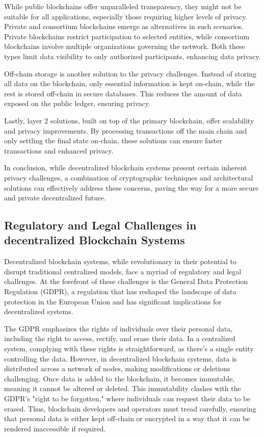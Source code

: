 While public blockchains offer unparalleled transparency, they might not be suitable for all applications, especially those requiring higher levels of privacy. Private and consortium blockchains emerge as alternatives in such scenarios. Private blockchains restrict participation to selected entities, while consortium blockchains involve multiple organizations governing the network. Both these types limit data visibility to only authorized participants, enhancing data privacy.

Off-chain storage is another solution to the privacy challenges. Instead of storing all data on the blockchain, only essential information is kept on-chain, while the rest is stored off-chain in secure databases. This reduces the amount of data exposed on the public ledger, ensuring privacy.

Lastly, layer 2 solutions, built on top of the primary blockchain, offer scalability and privacy improvements. By processing transactions off the main chain and only settling the final state on-chain, these solutions can ensure faster transactions and enhanced privacy.

In conclusion, while decentralized blockchain systems present certain inherent privacy challenges, a combination of cryptographic techniques and architectural solutions can effectively address these concerns, paving the way for a more secure and private decentralized future.

\subsection{Regulatory and Legal Challenges in decentralized Blockchain Systems}
Decentralized blockchain systems, while revolutionary in their potential to disrupt traditional centralized models, face a myriad of regulatory and legal challenges. At the forefront of these challenges is the General Data Protection Regulation (GDPR), a regulation that has reshaped the landscape of data protection in the European Union and has significant implications for decentralized systems.

The GDPR emphasizes the rights of individuals over their personal data, including the right to access, rectify, and erase their data. In a centralized system, complying with these rights is straightforward, as there's a single entity controlling the data. However, in decentralized blockchain systems, data is distributed across a network of nodes, making modifications or deletions challenging. Once data is added to the blockchain, it becomes immutable, meaning it cannot be altered or deleted. This immutability clashes with the GDPR's "right to be forgotten," where individuals can request their data to be erased. Thus, blockchain developers and operators must tread carefully, ensuring that personal data is either kept off-chain or encrypted in a way that it can be rendered inaccessible if required.

